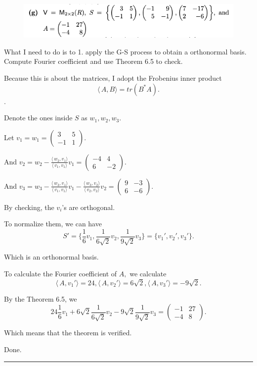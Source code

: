 \documentclass[12pt]{article}%
\begin{document}
\begin{figure}[htp]
    \centering %
    \includegraphics[width = 15cm]{img/Q6.png}
\end{figure}

What I need to do is to 1. apply the G-S process to obtain a orthonormal basis.
Compute Fourier coefficient and use Theorem 6.5 to check.

Because this is about the matrices, I adopt the Frobenius inner product $$\langle\, A , B \rangle =tr(B^{*}A).$$.

Denote the ones inside $S$ as $w_1,w_2,w_3.$

Let $v_1=w_1=\begin{pmatrix} 3&5\\-1&1\end{pmatrix}.$

And $v_2=w_2-\frac{\langle\, w_2 , v_1 \rangle}{\langle\, v_1 , v_1 \rangle}v_1=\begin{pmatrix} -4&4\\6&-2\end{pmatrix}.$

And $v_3=w_3-\frac{\langle\, w_3,v_1\rangle}{\langle\, v_1 , v_1 \rangle}v_1-\frac{\langle\, w_3,v_2\rangle}{\langle\, v_2 , v_2 \rangle}v_2=\begin{pmatrix}9&-3\\6&-6 \end{pmatrix}.$

By checking, the $v_i$'s are orthogonal.

To normalize them, we can have $$S'=\{ \frac{1}{6}v_1, \frac{1}{6\sqrt{2}}v_2, \frac{1}{9\sqrt{2}}v_3\}=\{v_1',v_2',v_3'\}.$$

Which is an orthonormal basis.

To calculate the Fourier coefficient of $A,$ we calculate $$\langle\, A , v_1' \rangle=24, \langle\, A , v_2' \rangle=6\sqrt{2}, \langle\, A , v_3' \rangle=-9\sqrt{2}.$$

By the Theorem 6.5, we $$24\frac{1}{6}v_1 + 6\sqrt{2}\frac{1}{6\sqrt{2}}v_2-9\sqrt{2}\frac{1}{9\sqrt{2}}v_3=\begin{pmatrix}-1&27\\-4&8 \end{pmatrix}.$$

Which means that the theorem is verified.

Done.

\noindent\rule[0.1ex]{\linewidth}{1pt}
\end{document}
